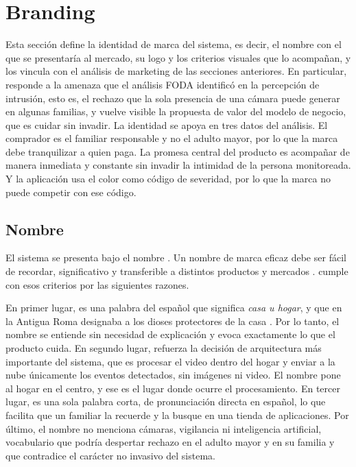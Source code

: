 \section{Branding}
\label{sec:branding}

Esta sección define la identidad de marca del sistema, es decir, el nombre con el que se presentaría al mercado, su logo y los criterios visuales que lo acompañan, y los vincula con el análisis de marketing de las secciones anteriores.
En particular, responde a la amenaza que el análisis FODA identificó en la percepción de intrusión, esto es, el rechazo que la sola presencia de una cámara puede generar en algunas familias, y vuelve visible la propuesta de valor del modelo de negocio, que es cuidar sin invadir.
La identidad se apoya en tres datos del análisis.
El comprador es el familiar responsable y no el adulto mayor, por lo que la marca debe tranquilizar a quien paga.
La promesa central del producto es acompañar de manera inmediata y constante sin invadir la intimidad de la persona monitoreada.
Y la aplicación usa el color como código de severidad, por lo que la marca no puede competir con ese código.

\subsection{Nombre}
\label{sec:branding-nombre}

El sistema se presenta bajo el nombre \marca.
Un nombre de marca eficaz debe ser fácil de recordar, significativo y transferible a distintos productos y mercados \parencite{Keller1993}.
\marca{} cumple con esos criterios por las siguientes razones.

En primer lugar, es una palabra del español que significa \emph{casa u hogar}, y que en la Antigua Roma designaba a los dioses protectores de la casa \parencite{RAE-lar}.
Por lo tanto, el nombre se entiende sin necesidad de explicación y evoca exactamente lo que el producto cuida.
En segundo lugar, refuerza la decisión de arquitectura más importante del sistema, que es procesar el video dentro del hogar y enviar a la nube únicamente los eventos detectados, sin imágenes ni video.
El nombre pone al hogar en el centro, y ese es el lugar donde ocurre el procesamiento.
En tercer lugar, es una sola palabra corta, de pronunciación directa en español, lo que facilita que un familiar la recuerde y la busque en una tienda de aplicaciones.
Por último, el nombre no menciona cámaras, vigilancia ni inteligencia artificial, vocabulario que podría despertar rechazo en el adulto mayor y en su familia y que contradice el carácter no invasivo del sistema.

